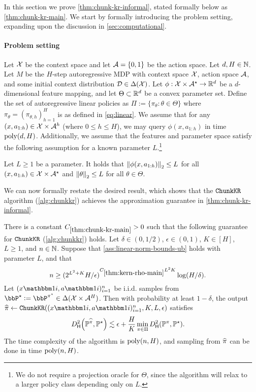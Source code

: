 
%

%

In this section we prove \cref{thm:chunk-kr-informal}, stated formally below as \cref{thm:chunk-kr-main}. We start by formally introducing the problem setting, expanding upon the discussion in \cref{sec:computational}.

\paragraph{Problem setting} Let $\mathcal{X}$ be the context space and let $\mathcal{A} = \{0,1\}$ be the action space. Let $d,H \in \mathbb{N}$. Let $M$ be the $H$-step autoregressive MDP with context space $\mathcal{X}$, action space $\mathcal{A}$, and some initial context distribution $\mathcal{D} \in \Delta(\mathcal{X})$. Let $\phi:\mathcal{X}\times\mathcal{A}^\star \to \mathbb{R}^d$ be a $d$-dimensional feature mapping, and let $\Theta \subset \mathbb{R}^d$ be a convex parameter set. Define the set of autoregressive linear policies as $\Pi := \{\pi_\theta:\theta\in\Theta\}$ where $\pi_\theta=  (\pi_{\theta,h})_{h=1}^H$ is as defined in \cref{eq:linear}. We assume that for any $(x,a_{1:h}) \in \mathcal{X}\times\mathcal{A}^h$ (where $0 \leq h \leq H$), we may query $\phi(x,a_{1:h})$ in time $\mathrm{poly}(d,H)$. Additionally, we assume that the features and parameter space satisfy the following assumption for a known parameter $L$.\footnote{We do not require a projection oracle for $\Theta$, since the algorithm will relax to a larger policy class depending only on $L$.}

\begin{assumption}\label{ass:linear-norm-bounds-ub}
  Let $L\geq 1$ be a parameter. It holds that $\left \lVert \phi(x,a_{1:h}) \right \rVert_2 \leq L$ for all $(x,a_{1:h}) \in \mathcal{X}\times\mathcal{A}^\star$ and $\left \lVert \theta \right \rVert_2 \leq L$ for all $\theta\in\Theta$.
\end{assumption}



We can now formally restate the desired result, which shows that the $\texttt{ChunkKR}$ algorithm (\cref{alg:chunkkr}) achieves the approximation guarantee in \cref{thm:chunk-kr-informal}.

\begin{theorem}\label{thm:chunk-kr-main}
There is a constant $C_{\ref{thm:chunk-kr-main}}>0$ such that the following guarantee for $\texttt{ChunkKR}$ (\cref{alg:chunkkr}) holds. Let $\delta \in (0,1/2)$, $\epsilon \in (0,1)$, $K \in [H]$, $L \geq 1$, and $n \in \mathbb{N}$. Suppose that \cref{ass:linear-norm-bounds-ub} holds with parameter $L$, and that 
\[n \geq (2^{L^2+K}H/\epsilon)^{C_{\ref{thm:kern-rho-main}}L^2K} \log(H/\delta).\] 
Let $(x\ind{i},a\ind{i})_{i=1}^n$ be i.i.d. samples from $\bbP^\st\ldef{}\bbP^{\pistar}\in \Delta(\MX\times\MA^H)$. Then with probability at least $1-\delta$, the output $\pihat\gets \ChunkKR((x\ind{i},a\ind{i})_{i=1}^n,K,L, \epsilon)$ satisfies
\[\Dhels{\BP^{\pihat}}{\BP^\star}
\lesssim \epsilon + \frac{H}{K} \min_{\pi\in\Pi} \Dhels{\BP^{\pi}}{\BP^\star}.\]
The time complexity of the algorithm is $\mathrm{poly}(n,H)$, and sampling from $\widehat{\pi}$ can be done in time $\mathrm{poly}(n, H)$.
\end{theorem}

